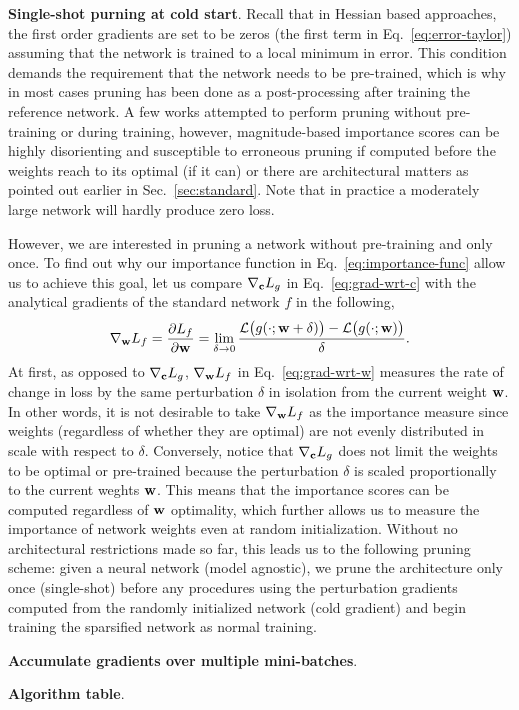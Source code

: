 {%
\textbf{Single-shot purning at cold start}.
Recall that in Hessian based approaches, the first order gradients are set to be zeros (the first term in Eq.~\ref{eq:error-taylor}) assuming that the network is trained to a local minimum in error.
This condition demands the requirement that the network needs to be pre-trained, which is why in most cases pruning has been done as a post-processing after training the reference network.
A few works attempted to perform pruning without pre-training or during training, however, magnitude-based importance scores can be highly disorienting and susceptible to erroneous pruning if computed before the weights reach to its optimal (if it can) or there are architectural matters as pointed out earlier in Sec.~\ref{sec:standard}.
Note that in practice a moderately large network will hardly produce zero loss.

However, we are interested in pruning a network without pre-training and only once.
To find out why our importance function in Eq.~\ref{eq:importance-func} allow us to achieve this goal, let us compare $\nabla_{{\mathbf{c}}} L_g$ in Eq.~\ref{eq:grad-wrt-c} with the analytical gradients of the standard network $f$ in the following,
\begin{equation}
    \nabla_{{\mathbf{w}}} L_f = \frac{\partial L_f}{\partial {\mathbf{w}}} = \lim_{\delta \to 0} \frac{\mathcal{L}\big( g(\cdot; {\mathbf{w}} + \delta) \big) - \mathcal{L}\big(g(\cdot; {\mathbf{w}})\big)}{\delta}. \\
    \label{eq:grad-wrt-w}
\end{equation}
At first, as opposed to $\nabla_{{\mathbf{c}}} L_g$, $\nabla_{{\mathbf{w}}} L_f$ in Eq.~\ref{eq:grad-wrt-w} measures the rate of change in loss by the same perturbation $\delta$ in isolation from the current weight ${\mathbf{w}}$.
In other words, it is not desirable to take $\nabla_{{\mathbf{w}}} L_f$ as the importance measure since weights (regardless of whether they are optimal) are not evenly distributed in scale with respect to $\delta$.
Conversely, notice that $\nabla_{{\mathbf{c}}} L_g$ does not limit the weights to be optimal or pre-trained because the perturbation $\delta$ is scaled proportionally to the current weghts ${\mathbf{w}}$.
This means that the importance scores can be computed regardless of ${\mathbf{w}}$ optimality, which further allows us to measure the importance of network weights even at random initialization.
Without no architectural restrictions made so far, this leads us to the following pruning scheme: given a neural network (model agnostic), we prune the architecture only once (single-shot) before any procedures using the perturbation gradients computed from the randomly initialized network (cold gradient) and begin training the sparsified network as normal training.

\textbf{Accumulate gradients over multiple mini-batches}.

\textbf{Algorithm table}.

\clearpage
}

